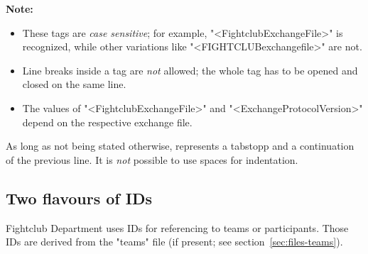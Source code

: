\documentclass[11pt]{ltxdoc}
\def\highlight#1{%
    \colorbox{red!15}{#1}%
    \index{\textsf{#1}}}
\begin{document}
    \bigskip
    \textbf{Note:}
    \begin{itemize}
        \item
            These tags are \textit{case sensitive}; for example, "<FightclubExchangeFile>" is recognized, while other variations like "<FIGHTCLUBexchangefile>" are not.
        \item
            Line breaks inside a tag are \textit{not} allowed; the whole tag has to be opened and closed on the same line.
        
        \item
            The values of "<FightclubExchangeFile>" and "<ExchangeProtocolVersion>" depend on the respective exchange file.
    \end{itemize} 
    
    \medskip
    As long as not being stated otherwise, \highlight{\mapsto} represents a tabstopp and \highlight{\hookrightarrow} a continuation of the previous line. It is \textit{not} possible to use spaces for indentation.
    
    
    
    \subsection{Two flavours of IDs}\label{sec:notes-id}
    Fightclub Department uses IDs for referencing to teams or participants. Those IDs are derived from the "teams" file (if present; see section~\ref{sec:files-teams}).
    
\end{document}
